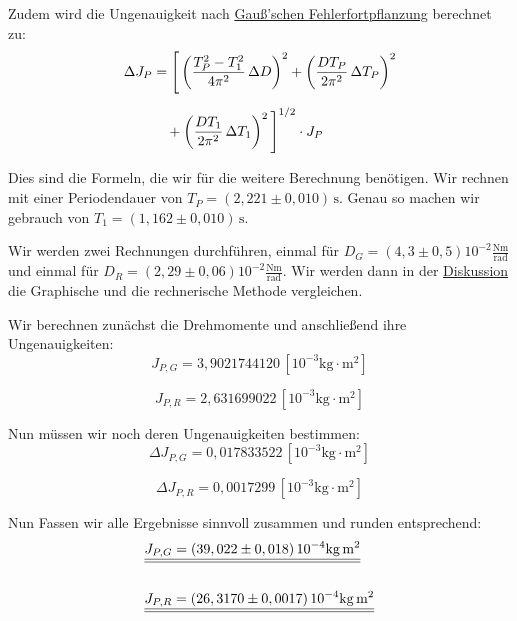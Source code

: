 Zudem wird die Ungenauigkeit nach \hyperref[eq:gauss_fehlfortpflanzung]{Gauß'schen Fehlerfortpflanzung} berechnet zu:
\begin{align}
\Delta J_P &= \Bigg[
    \left( \frac{T_P^2 - T_1^2}{4\pi^2} \, \Delta D \right)^2
    + \left( \frac{D T_P}{2\pi^2} \, \Delta T_P \right)^2 \notag \\[6pt]
&\quad
    + \left( \frac{D T_1}{2\pi^2} \, \Delta T_1 \right)^2
\Bigg]^{1/2} \cdot J_P
\end{align}

Dies sind die Formeln, die wir für die weitere Berechnung benötigen. Wir rechnen mit einer Periodendauer von $T_P = (2,221 \pm 0,010)\, \mathrm{s}$.
Genau so machen wir gebrauch von $T_1 = (1,162 \pm 0,010)\, \mathrm{s}$.

Wir werden zwei Rechnungen durchführen, einmal für $D_G =(4,3 \pm 0,5) 10^{-2} \mathrm{\frac{Nm}{rad}}$ und einmal für
$D_R =(2,29 \pm 0,06) 10^{-2} \mathrm{\frac{Nm}{rad}}$. Wir werden dann in der \hyperref[Diskussion]{Diskussion} die Graphische und die rechnerische Methode vergleichen.

Wir berechnen zunächst die Drehmomente und anschließend ihre Ungenauigkeiten:
\begin{equation}
    J_{P,G} = 3,9021744120 \, [\mathrm{10^{-3} kg \cdot m^2}]
    \label{eq:J_P_G}
\end{equation}

\begin{equation}
    J_{P,R} = 2,631699022 \, [\mathrm{10^{-3} kg \cdot m^2}]
    \label{eq:J_P_R}
\end{equation}

Nun müssen wir noch deren Ungenauigkeiten bestimmen:
\begin{equation}
    \Delta J_{P,G} = 0,017833522 \, [\mathrm{10^{-3} kg \cdot m^2}]
\end{equation}

\begin{equation}
    \Delta J_{P,R} = 0,0017299 \, [\mathrm{10^{-3} kg \cdot m^2}]
\end{equation}

Nun Fassen wir alle Ergebnisse sinnvoll zusammen und runden entsprechend: 
\begin{align}
    &\underline{\underline{J_{P,G} = (39,022 \pm 0,018)\, \mathrm{10^{-4}kg \, m^2}}} \\
        \notag \\
    &\underline{\underline{J_{P,R} = (26,3170 \pm 0,0017 )\, \mathrm{10^{-4} kg \, m^2}}}
    \label{e:s_t}
\end{align}

